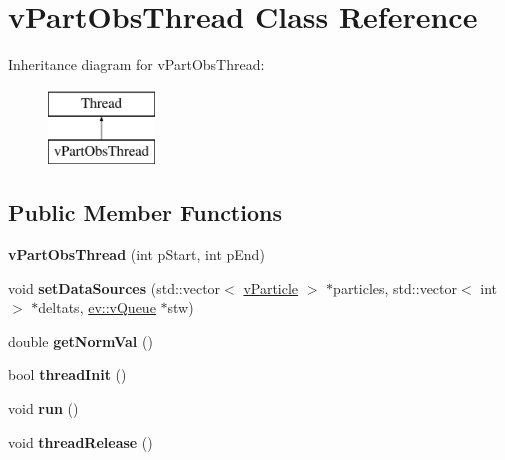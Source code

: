 \hypertarget{classvPartObsThread}{}\section{v\+Part\+Obs\+Thread Class Reference}
\label{classvPartObsThread}
Inheritance diagram for v\+Part\+Obs\+Thread\+:\begin{figure}[H]
\begin{center}
\leavevmode
\includegraphics[height=2.000000cm]{classvPartObsThread}
\end{center}
\end{figure}
\subsection*{Public Member Functions}
\begin{DoxyCompactItemize}
\item 
{\bfseries v\+Part\+Obs\+Thread} (int p\+Start, int p\+End)\hypertarget{classvPartObsThread_ad5ee91bcd5ace1cac76ac13843597d3d}{}\label{classvPartObsThread_ad5ee91bcd5ace1cac76ac13843597d3d}

\item 
void {\bfseries set\+Data\+Sources} (std\+::vector$<$ \hyperlink{classvParticle}{v\+Particle} $>$ $\ast$particles, std\+::vector$<$ int $>$ $\ast$deltats, \hyperlink{classev_1_1vQueue}{ev\+::v\+Queue} $\ast$stw)\hypertarget{classvPartObsThread_aedc0c0ef46d5cc48754621b41936a23d}{}\label{classvPartObsThread_aedc0c0ef46d5cc48754621b41936a23d}

\item 
double {\bfseries get\+Norm\+Val} ()\hypertarget{classvPartObsThread_a2bc5cbff69dd31bd7b571579d6b34930}{}\label{classvPartObsThread_a2bc5cbff69dd31bd7b571579d6b34930}

\item 
bool {\bfseries thread\+Init} ()\hypertarget{classvPartObsThread_a5814f390e326d1bd4cfa82e34855d3d4}{}\label{classvPartObsThread_a5814f390e326d1bd4cfa82e34855d3d4}

\item 
void {\bfseries run} ()\hypertarget{classvPartObsThread_ae261ba48ff6af1ad105adc5ed8fd5373}{}\label{classvPartObsThread_ae261ba48ff6af1ad105adc5ed8fd5373}

\item 
void {\bfseries thread\+Release} ()\hypertarget{classvPartObsThread_a080024e2fc09ae2e3ca16b686d9a2791}{}\label{classvPartObsThread_a080024e2fc09ae2e3ca16b686d9a2791}

\end{DoxyCompactItemize}


